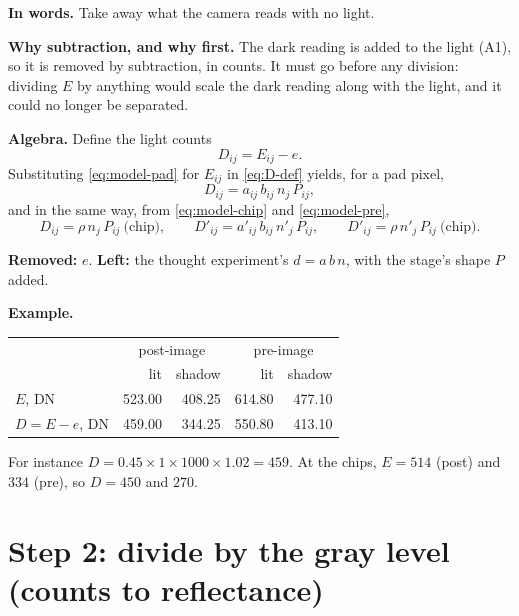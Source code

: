 \documentclass[11pt,letter]{article}
\begin{document}
\textbf{In words.}  Take away what the camera reads with no light.

\textbf{Why subtraction, and why first.}  The dark reading is added to the
light (A1), so it is removed by subtraction, in counts.  It must go before
any division: dividing $E$ by anything would scale the dark reading along
with the light, and it could no longer be separated.

\textbf{Algebra.}  Define the light counts
\begin{equation}
  D_{ij} = E_{ij} - e .
  \label{eq:D-def}
\end{equation}
Substituting \eqref{eq:model-pad} for $E_{ij}$ in \eqref{eq:D-def} yields,
for a pad pixel,
\begin{equation}
  D_{ij} = a_{ij}\, b_{ij}\, n_j\, P_{ij} ,
  \label{eq:D}
\end{equation}
and in the same way, from \eqref{eq:model-chip} and \eqref{eq:model-pre},
\begin{equation}
  D_{ij} = \rho\, n_j\, P_{ij} \ \text{(chip)}, \qquad
  D'_{ij} = a'_{ij}\, b_{ij}\, n'_j\, P_{ij}, \qquad
  D'_{ij} = \rho\, n'_j\, P_{ij} \ \text{(chip)}.
  \label{eq:D-others}
\end{equation}

\textbf{Removed:} $e$.  \textbf{Left:} the thought experiment's
$d = a\,b\,n$, with the stage's shape $P$ added.

\textbf{Example.}

\medskip
\begin{center}
\begin{tabular}{@{}lrrrr@{}}
\toprule
 & \multicolumn{2}{c}{post-image} & \multicolumn{2}{c}{pre-image} \\
 & lit & shadow & lit & shadow \\
\midrule
$E$, DN & 523.00 & 408.25 & 614.80 & 477.10 \\
$D = E - e$, DN & 459.00 & 344.25 & 550.80 & 413.10 \\
\bottomrule
\end{tabular}
\end{center}
\noindent For instance $D = 0.45 \times 1 \times 1000 \times 1.02 = 459$.
At the chips, $E = 514$ (post) and $334$ (pre), so $D = 450$ and $270$.

\section{Step 2: divide by the gray level (counts to reflectance)}
\label{sec:gray}
\end{document}
